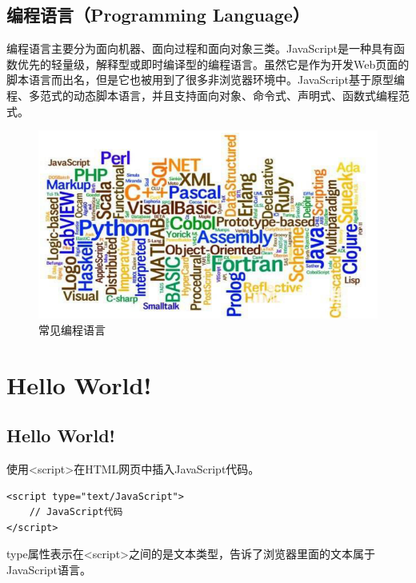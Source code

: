 \vspace{0.5cm}

\subsection{编程语言（Programming Language）}

编程语言主要分为面向机器、面向过程和面向对象三类。JavaScript是一种具有函数优先的轻量级，解释型或即时编译型的编程语言。虽然它是作为开发Web页面的脚本语言而出名，但是它也被用到了很多非浏览器环境中。JavaScript基于原型编程、多范式的动态脚本语言，并且支持面向对象、命令式、声明式、函数式编程范式。

\begin{figure}[H]
	\centering
	\includegraphics[scale=0.9]{img/C9/9-1/1.png}
	\caption{常见编程语言}
\end{figure}

\newpage

\section{Hello World!}

\subsection{Hello World!}

使用<script>在HTML网页中插入JavaScript代码。\\

\begin{lstlisting}[style=htmlcssjs]
<script type="text/JavaScript">
    // JavaScript代码
</script>
\end{lstlisting}

type属性表示在<script>之间的是文本类型，告诉了浏览器里面的文本属于JavaScript语言。\\

